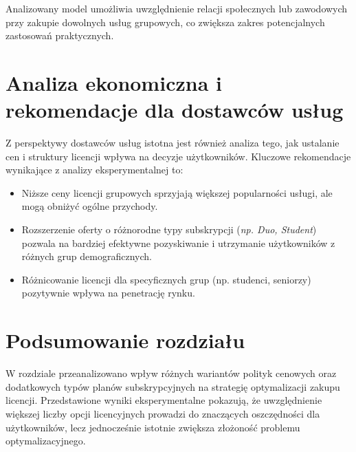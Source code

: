 Analizowany model umożliwia uwzględnienie relacji społecznych lub zawodowych przy zakupie dowolnych usług grupowych, co zwiększa zakres potencjalnych zastosowań praktycznych.

\section{Analiza ekonomiczna i rekomendacje dla dostawców usług}

Z perspektywy dostawców usług istotna jest również analiza tego, jak ustalanie cen i struktury licencji wpływa na decyzje użytkowników. Kluczowe rekomendacje wynikające z analizy eksperymentalnej to:

\begin{itemize}
    \item Niższe ceny licencji grupowych sprzyjają większej popularności usługi, ale mogą obniżyć ogólne przychody.
    \item Rozszerzenie oferty o różnorodne typy subskrypcji (\textit{np. Duo, Student}) pozwala na bardziej efektywne pozyskiwanie i utrzymanie użytkowników z różnych grup demograficznych.
    \item Różnicowanie licencji dla specyficznych grup (np. studenci, seniorzy) pozytywnie wpływa na penetrację rynku.
\end{itemize}

\section{Podsumowanie rozdziału}

W rozdziale przeanalizowano wpływ różnych wariantów polityk cenowych oraz dodatkowych typów planów subskrypcyjnych na strategię optymalizacji zakupu licencji. Przedstawione wyniki eksperymentalne pokazują, że uwzględnienie większej liczby opcji licencyjnych prowadzi do znaczących oszczędności dla użytkowników, lecz jednocześnie istotnie zwiększa złożoność problemu optymalizacyjnego.
